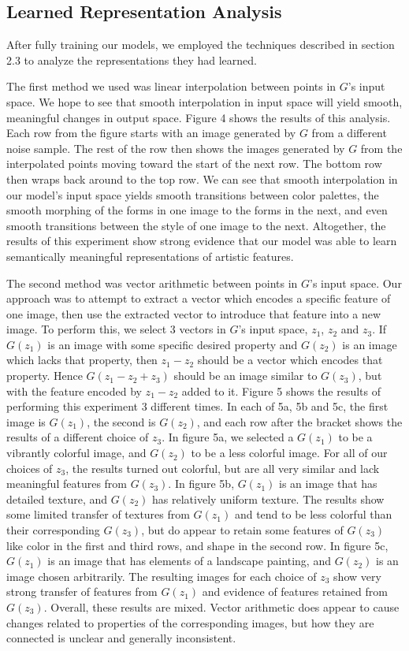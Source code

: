 \documentclass[10pt,twocolumn,letterpaper]{article}
\begin{document}
\subsection{Learned Representation Analysis}
After fully training our models, we employed the techniques described in section 2.3 to analyze the representations they had learned. 

The first method we used was linear interpolation between points in $ G $'s input space. We hope to see that smooth interpolation in input space will yield smooth, meaningful changes in output space. Figure 4 shows the results of this analysis. Each row from the figure starts with an image generated by $ G $ from a different noise sample. The rest of the row then shows the images generated by $ G $ from the interpolated points moving toward the start of the next row. The bottom row then wraps back around to the top row. We can see that smooth interpolation in our model's input space yields smooth transitions between color palettes, the smooth morphing of the forms in one image to the forms in the next, and even smooth transitions between the style of one image to the next. Altogether, the results of this experiment show strong evidence that our model was able to learn semantically meaningful representations of artistic features.

The second method was vector arithmetic between points in $ G $'s input space. Our approach was to attempt to extract a vector which encodes a specific feature of one image, then use the extracted vector to introduce that feature into a new image. To perform this, we select 3 vectors in $ G $'s input space, $ z_1 $, $ z_2 $ and $ z_3 $. If $ G(z_1) $ is an image with some specific desired property and $ G(z_2) $ is an image which lacks that property, then $ z_1 - z_2 $ should be a vector which encodes that property. Hence $ G(z_1 - z_2 + z_3) $ should be an image similar to $ G(z_3) $, but with the feature encoded by $ z_1 - z_2 $ added to it. Figure 5 shows the results of performing this experiment 3 different times. In each of 5a, 5b and 5c, the first image is $ G(z_1) $, the second is $ G(z_2) $, and each row after the bracket shows the results of a different choice of $ z_3 $. In figure 5a, we selected a $ G(z_1) $ to be a vibrantly colorful image, and $ G(z_2) $ to be a less colorful image. For all of our choices of $ z_3 $, the results turned out colorful, but are all very similar and lack meaningful features from $ G(z_3) $. In figure 5b, $ G(z_1) $ is an image that has detailed texture, and $ G(z_2) $ has relatively uniform texture. The results show some limited transfer of textures from $ G(z_1) $ and tend to be less colorful than their corresponding $ G(z_3) $, but do appear to retain some features of $ G(z_3) $ like color in the first and third rows, and shape in the second row. In figure 5c, $ G(z_1) $ is an image that has elements of a landscape painting, and $ G(z_2) $ is an image chosen arbitrarily. The resulting images for each choice of $ z_3 $ show very strong transfer of features from $ G(z_1) $ and evidence of features retained from $ G(z_3) $. Overall, these results are mixed. Vector arithmetic does appear to cause changes related to properties of the corresponding images, but how they are connected is unclear and generally inconsistent.
\end{document}
